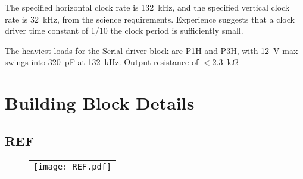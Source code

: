 \documentclass[a4paper,12pt]{article}
\begin{document}
The specified horizontal clock rate is 132\ kHz, and the specified vertical clock rate is 32\ kHz, from the science requirements. Experience suggests that a clock driver time constant of 1/10 the clock period  is sufficiently small. 

The heaviest loads for the Serial-driver block are P1H and P3H, with 12\ V max swings into 320\ pF at 132\ kHz. Output resistance of $<$2.3\ k$\Omega$












\section{Building Block Details}
\subsection{REF}
   \begin{figure}
   \begin{center}
   \begin{tabular}{c}
   \texttt{[image: REF.pdf]}
   \end{tabular}
   \end{center}
   \end{figure}
\end{document}
